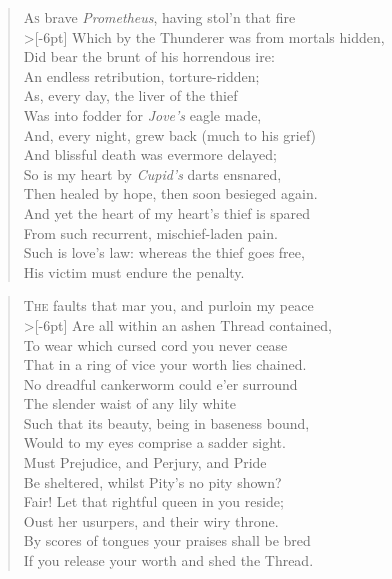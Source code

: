 \documentclass[a5paper, 12pt, oneside]{memoir}
\begin{document}
\PoemTitle{}
\begin{verse}
    \lettrine{A}{s} brave \textit{Prometheus}, having stol'n that fire \\>[-6pt]
    Which by the Thunderer was from mortals hidden, \\
    Did bear the brunt of his horrendous ire: \\
    An endless retribution, torture-ridden; \\
    As, every day, the liver of the thief \\
    Was into fodder for \textit{Jove's} eagle made, \\
    And, every night, grew back (much to his grief) \\
    And blissful death was evermore delayed; \\
    So is my heart by \textit{Cupid's} darts ensnared, \\
    Then healed by hope, then soon besieged again. \\
    And yet the heart of my heart's thief is spared \\
    From such recurrent, mischief-laden pain. \\
    \vin Such is love's law: whereas the thief goes free, \\
    \vin His victim must endure the penalty. 
\end{verse}

\PoemTitle{}
\begin{verse}
    \lettrine{T}{he} faults that mar you, and purloin my peace \\>[-6pt]
    Are all within an ashen Thread contained, \\
    To wear which cursed cord you never cease \\
    That in a ring of vice your worth lies chained. \\
    No dreadful cankerworm could e'er surround \\
    The slender waist of any lily white \\
    Such that its beauty, being in baseness bound, \\
    Would to my eyes comprise a sadder sight. \\
    Must Prejudice, and Perjury, and Pride \\
    Be sheltered, whilst Pity's no pity shown? \\
    Fair! Let that rightful queen in you reside; \\
    Oust her usurpers, and their wiry throne. \\
    \vin By scores of tongues your praises shall be bred \\
    \vin If you release your worth and shed the Thread.
\end{verse}
\end{document}
